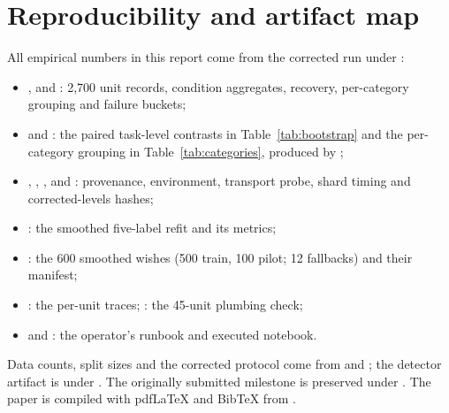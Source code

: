 \documentclass{article}
\begin{document}
\section{Reproducibility and artifact map}
\label{sec:reproduce}

All empirical numbers in this report come from the corrected run under
:

\begin{itemize}
  \item {},  and : 2{,}700 unit
        records, condition aggregates, recovery, per-category grouping and failure buckets;
  \item {} and : the paired task-level contrasts in
        Table~\ref{tab:bootstrap} and the per-category grouping in
        Table~\ref{tab:categories}, produced by ;
  \item {}, , ,
         and : provenance, environment,
        transport probe, shard timing and corrected-levels hashes;
  \item {}: the smoothed five-label refit and its metrics;
  \item {}: the 600 smoothed wishes (500 train, 100 pilot; 12 fallbacks) and
        their manifest;
  \item {}: the per-unit traces; : the 45-unit plumbing check;
  \item {} and : the operator's runbook and
        executed notebook.
\end{itemize}

Data counts, split sizes and the corrected protocol come from 
and ; the detector artifact is under
. The originally submitted milestone is preserved under
. The paper is compiled with pdf\LaTeX{} and BibTeX from
.



\end{document}
